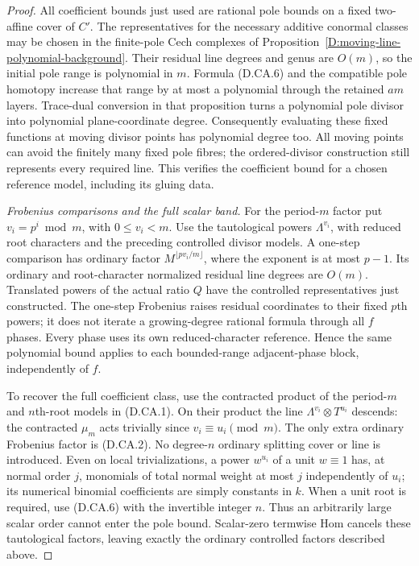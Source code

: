 \begin{proof}
All coefficient bounds just used are rational pole bounds
on a fixed two-affine cover of $C'$. The representatives
for the necessary additive conormal classes may be chosen
in the finite-pole Cech complexes of
Proposition~\ref{D:moving-line-polynomial-background}.
Their residual line degrees and genus are $O(m)$, so the
initial pole range is polynomial in $m$. Formula (D.CA.6)
and the compatible pole homotopy increase that range by
at most a polynomial through the retained $am$ layers.
Trace-dual conversion in that proposition turns a
polynomial pole divisor into polynomial plane-coordinate
degree. Consequently evaluating these fixed functions
at moving divisor points has polynomial degree too.
All moving points can avoid the finitely many fixed pole
fibres; the ordered-divisor construction still represents
every required line. This verifies the coefficient bound
for a chosen reference model, including its gluing data.

\emph{Frobenius comparisons and the full scalar band.}
For the period-$m$ factor put $v_i=p^i\bmod m$, with
$0\leq v_i<m$. Use the tautological powers $\Lambda^{v_i}$,
with reduced root characters and the preceding controlled
divisor models. A one-step comparison has ordinary factor
$M^{\lfloor p v_i/m\rfloor}$, where the exponent is at
most $p-1$. Its ordinary and root-character normalized
residual line degrees are $O(m)$. Translated powers of
the actual ratio $Q$ have the controlled representatives
just constructed. The one-step Frobenius raises residual
coordinates to their fixed $p$th powers; it does not
iterate a growing-degree rational formula through all
$f$ phases. Every phase uses its own reduced-character
reference. Hence the same polynomial bound applies to
each bounded-range adjacent-phase block, independently
of $f$.

To recover the full coefficient class, use the contracted
product of the period-$m$ and $n$th-root models in
(D.CA.1). On their product the line
$\Lambda^{v_i}\otimes T^{u_i}$ descends: the contracted
$\mu_m$ acts trivially since $v_i\equiv u_i\pmod m$.
The only extra ordinary Frobenius factor is (D.CA.2).
No degree-$n$ ordinary splitting cover or line is
introduced. Even on local trivializations, a power
$w^{u_i}$ of a unit $w\equiv1$ has, at normal order $j$,
monomials of total normal weight at most $j$ independently
of $u_i$; its numerical binomial coefficients are simply
constants in $k$. When a unit root is required, use
(D.CA.6) with the invertible integer $n$. Thus an arbitrarily
large scalar order cannot enter the pole bound. Scalar-zero
termwise Hom cancels these tautological factors, leaving
exactly the ordinary controlled factors described above.


\end{proof}
